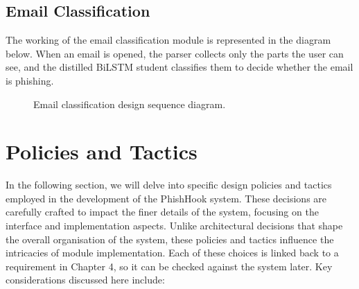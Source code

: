 \documentclass{FastFyp}
\begin{document}
\subsection{Email Classification}
The working of the email classification module is represented in the diagram below. When an email is opened, the parser collects only the parts the user can see, and the distilled BiLSTM student classifies them to decide whether the email is phishing.

\begin{figure}[H]
\centering
{}
\caption{Email classification design sequence diagram.}
\label{fig:seq-email}
\end{figure}


\section{Policies and Tactics}
\label{sec:policies}
In the following section, we will delve into specific design policies and tactics employed in the development of the PhishHook system. These decisions are carefully crafted to impact the finer details of the system, focusing on the interface and implementation aspects. Unlike architectural decisions that shape the overall organisation of the system, these policies and tactics influence the intricacies of module implementation. Each of these choices is linked back to a requirement in Chapter 4, so it can be checked against the system later. Key considerations discussed here include:
\end{document}
